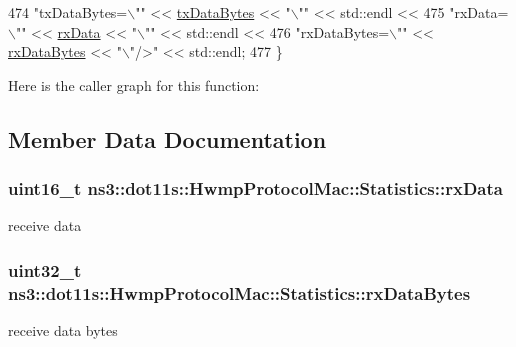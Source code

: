 \begin{DoxyCode}
474   \textcolor{stringliteral}{"txDataBytes=\(\backslash\)""} << \hyperlink{structns3_1_1dot11s_1_1HwmpProtocolMac_1_1Statistics_a50db26efb7b9d224d4c803000a31ae39}{txDataBytes} << \textcolor{stringliteral}{"\(\backslash\)""} << std::endl <<
475   \textcolor{stringliteral}{"rxData=\(\backslash\)""} << \hyperlink{structns3_1_1dot11s_1_1HwmpProtocolMac_1_1Statistics_a86cc234b540b881cb752768f22345d77}{rxData} << \textcolor{stringliteral}{"\(\backslash\)""} << std::endl <<
476   \textcolor{stringliteral}{"rxDataBytes=\(\backslash\)""} << \hyperlink{structns3_1_1dot11s_1_1HwmpProtocolMac_1_1Statistics_aca61136ff1c29fb38824c88972990475}{rxDataBytes} << \textcolor{stringliteral}{"\(\backslash\)"/>"} << std::endl;
477 \}
\end{DoxyCode}


Here is the caller graph for this function\+:




\subsection{Member Data Documentation}
\subsubsection[{\texorpdfstring{rx\+Data}{rxData}}]{\setlength{\rightskip}{0pt plus 5cm}uint16\+\_\+t ns3\+::dot11s\+::\+Hwmp\+Protocol\+Mac\+::\+Statistics\+::rx\+Data}\hypertarget{structns3_1_1dot11s_1_1HwmpProtocolMac_1_1Statistics_a86cc234b540b881cb752768f22345d77}{}\label{structns3_1_1dot11s_1_1HwmpProtocolMac_1_1Statistics_a86cc234b540b881cb752768f22345d77}


receive data 

\subsubsection[{\texorpdfstring{rx\+Data\+Bytes}{rxDataBytes}}]{\setlength{\rightskip}{0pt plus 5cm}uint32\+\_\+t ns3\+::dot11s\+::\+Hwmp\+Protocol\+Mac\+::\+Statistics\+::rx\+Data\+Bytes}\hypertarget{structns3_1_1dot11s_1_1HwmpProtocolMac_1_1Statistics_aca61136ff1c29fb38824c88972990475}{}\label{structns3_1_1dot11s_1_1HwmpProtocolMac_1_1Statistics_aca61136ff1c29fb38824c88972990475}
receive data bytes 

